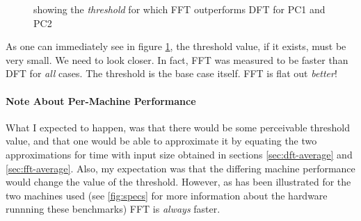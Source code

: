 \documentclass[]{article}
\begin{document}
\begin{figure}
	\begin{center}
		\caption{showing the \emph{threshold} for which FFT outperforms DFT for PC1 and PC2\label{fig:compar10}}
	\end{center}
\end{figure}
As one can immediately see in figure \ref{fig:compar10}, the threshold value, if it exists, must be very small. We need to look closer. In fact, FFT was measured to be faster than DFT for \emph{all} cases. The threshold is the base case itself. FFT is flat out \emph{better}!

\paragraph{Note About Per-Machine Performance} What I expected to happen, was that there would be some perceivable threshold value, and that one would be able to approximate it by equating the two approximations for time with input size obtained in sections \ref{sec:dft-average} and \ref{sec:fft-average}. Also, my expectation was that the differing machine performance would change the value of the threshold. However, as has been illustrated for the two machines used (see \ref{fig:specs} for more information about the hardware runnning these benchmarks) FFT is \emph{always} faster. 
\end{document}
